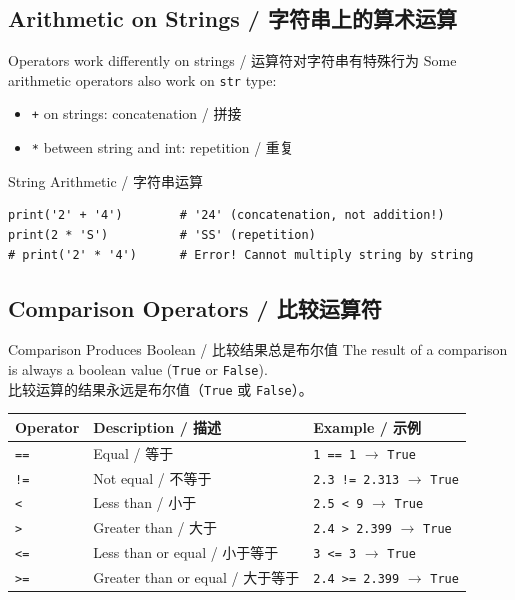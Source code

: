 \documentclass[11pt,a4paper]{report}
\let\oldtexttt\texttt
\renewcommand{\texttt}[1]{\textcolor{mainblue}{\oldtexttt{#1}}}
\begin{document}
\subsection{Arithmetic on Strings / 字符串上的算术运算}

\begin{concept}{Operators work differently on strings / 运算符对字符串有特殊行为}
    Some arithmetic operators also work on \texttt{str} type:
    \begin{itemize}
        \item \texttt{+} on strings: concatenation / 拼接
        \item \texttt{*} between string and int: repetition / 重复
    \end{itemize}
\end{concept}

\begin{examplebox}{String Arithmetic / 字符串运算}
\begin{lstlisting}
print('2' + '4')        # '24' (concatenation, not addition!)
print(2 * 'S')          # 'SS' (repetition)
# print('2' * '4')      # Error! Cannot multiply string by string
\end{lstlisting}
\end{examplebox}

\subsection{Comparison Operators / 比较运算符}

\begin{concept}{Comparison Produces Boolean / 比较结果总是布尔值}
    The result of a comparison is always a boolean value (\texttt{True} or \texttt{False}). \\
    比较运算的结果永远是布尔值（\texttt{True} 或 \texttt{False}）。
\end{concept}

\medskip
\centering
\renewcommand{\arraystretch}{1.5}
\begin{tabular}{@{}lll@{}}
\toprule
\textbf{Operator} & \textbf{Description / 描述} & \textbf{Example / 示例} \\ \midrule
\texttt{==} & Equal / 等于               & \texttt{1 == 1} $\rightarrow$ \texttt{True} \\
\texttt{!=} & Not equal / 不等于          & \texttt{2.3 != 2.313} $\rightarrow$ \texttt{True} \\
\texttt{<}  & Less than / 小于             & \texttt{2.5 < 9} $\rightarrow$ \texttt{True} \\
\texttt{>}  & Greater than / 大于          & \texttt{2.4 > 2.399} $\rightarrow$ \texttt{True} \\
\texttt{<=} & Less than or equal / 小于等于  & \texttt{3 <= 3} $\rightarrow$ \texttt{True} \\
\texttt{>=} & Greater than or equal / 大于等于 & \texttt{2.4 >= 2.399} $\rightarrow$ \texttt{True} \\ \bottomrule
\end{tabular}
\medskip
\end{document}
